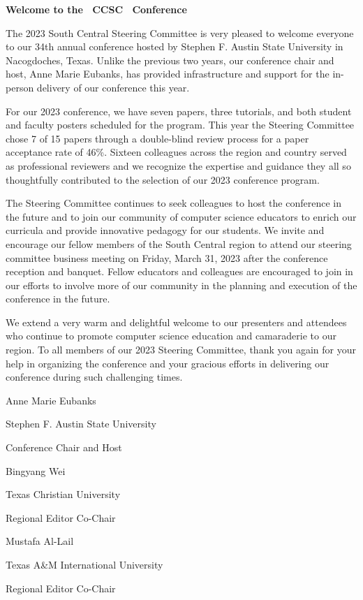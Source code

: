 \documentclass{article}
\begin{document}
\begingroup
  \centering
  \textbf{\large Welcome to the \confYear\ CCSC \confName\ Conference\\}
\endgroup

\vspace{10pt}

The 2023 South Central Steering Committee is very pleased to welcome everyone to our 34th annual conference hosted by Stephen F. Austin State
University in Nacogdoches, Texas. Unlike the previous two years, our conference chair and host, Anne Marie Eubanks, has provided infrastructure and support
for the in-person delivery of our conference this year.

For our 2023 conference, we have seven papers, three tutorials, and both student and faculty posters scheduled for the program. This year the Steering
Committee chose 7 of 15 papers through a double-blind review process for a paper acceptance rate of 46\%. Sixteen colleagues across the region and country
served as professional reviewers and we recognize the expertise and guidance they all so thoughtfully contributed to the selection of our 2023 conference
program.

The Steering Committee continues to seek colleagues to host the conference in the future and to join our community of computer science educators to enrich
our curricula and provide innovative pedagogy for our students. We invite and encourage our fellow members of the South Central region to attend our steering
committee business meeting on Friday, March 31, 2023 after the conference reception and banquet. Fellow educators and colleagues are encouraged to join
in our efforts to involve more of our community in the planning and execution of the conference in the future.

We extend a very warm and delightful welcome to our presenters and attendees who continue to promote computer science education and camaraderie to
our region. To all members of our 2023 Steering Committee, thank you again for your help in organizing the conference and your gracious efforts in delivering our conference during such challenging times.

\vspace{10pt}

\hfill Anne Marie Eubanks

\hfill Stephen F. Austin State University

\hfill Conference Chair and Host

\vspace{10pt}

\hfill Bingyang Wei

\hfill Texas Christian University

\hfill Regional Editor Co-Chair

\vspace{10pt}

\hfill Mustafa Al-Lail

\hfill Texas A\&M International University

\hfill Regional Editor Co-Chair
\end{document}
